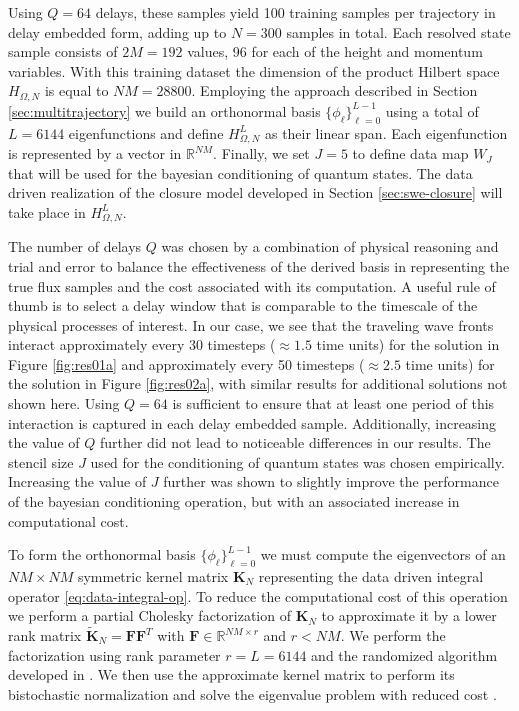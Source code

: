 \documentclass[letterpaper,10pt,3p,preprint]{elsarticle}
\newcommand{\Rbb}{\mathbb{R}}
\newcommand{\matr}[1]{\bm{#1}}
\begin{document}
Using $Q=64$ delays, these samples yield 100 training samples
per trajectory in delay embedded form, adding up to $N=300$
samples in total.
Each resolved state sample consists of $2M=192$ values,
96 for each of the height and momentum variables.
With this training dataset the dimension of the product
Hilbert space $H_{\Omega,N}$ is equal to $NM=28800$.
Employing the approach described in Section \ref{sec:multitrajectory}
we build an orthonormal basis $\{\phi_\ell\}_{\ell=0}^{L-1}$
using a total of $L=6144$ eigenfunctions and define
$H_{\Omega,N}^L$ as their linear span.
Each eigenfunction is represented by a vector in $\Rbb^{NM}$.
Finally, we set $J=5$ to define data map $W_J$ that will be used
for the bayesian conditioning of quantum states.
The data driven realization of the closure model developed
in Section \ref{sec:swe-closure}
will take place in $H_{\Omega,N}^L$.

The number of delays $Q$ was chosen by a combination of
physical reasoning and trial and error
to balance the effectiveness of the derived basis
in representing the true flux samples and the cost associated
with its computation.
A useful rule of thumb is to select a delay window that is
comparable to the timescale of the physical processes of interest.
In our case, we see that the traveling wave fronts interact
approximately every 30 timesteps ($\approx 1.5$ time units)
for the solution in Figure \ref{fig:res01a}
and approximately every 50 timesteps ($\approx 2.5$ time units)
for the solution in Figure \ref{fig:res02a},
with similar results for additional solutions not shown here.
Using $Q=64$ is sufficient to ensure that at least one period
of this interaction is captured in each delay embedded sample.
Additionally, increasing the value of $Q$ further did not lead
to noticeable differences in our results.
The stencil size $J$ used for the conditioning of quantum states
was chosen empirically.
Increasing the value of $J$ further was shown to slightly improve
the performance of the bayesian conditioning operation, but with
an associated increase in computational cost.

To form the orthonormal basis
$\{\phi_\ell\}_{\ell=0}^{L-1}$
we must compute the eigenvectors of an $NM\times NM$
symmetric kernel matrix $\matr{K}_N$ representing the
data driven integral operator
\eqref{eq:data-integral-op}.
To reduce the computational cost of this operation
we perform a partial Cholesky factorization of
$\matr{K}_N$ to approximate it by a lower rank matrix
$\tilde{\matr{K}}_N=\matr{F}\matr{F}^T$
with $\matr{F}\in\Rbb^{NM\times r}$ and $r<NM$.
We perform the factorization using rank parameter
$r=L=6144$ and the randomized algorithm developed in
\cite{YChen2024}.
We then use the approximate kernel matrix to perform its
bistochastic normalization and solve the eigenvalue
problem with reduced cost
\cite{Vales2025evd}.
\end{document}
